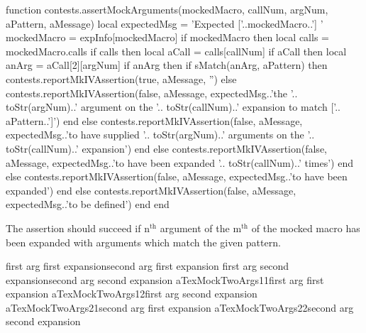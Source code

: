 \startLuaCode
function contests.assertMockArguments(mockedMacro,
                                      callNum,
                                      argNum,
                                      aPattern,
                                      aMessage)
  local expectedMsg = 'Expected ['..mockedMacro..'] '
  mockedMacro = expInfo[mockedMacro]
  if mockedMacro then
    local calls = mockedMacro.calls
    if calls then
      local aCall = calls[callNum]
      if aCall then
        local anArg = aCall[2][argNum]
        if anArg then
          if sMatch(anArg, aPattern) then
            contests.reportMkIVAssertion(true, aMessage, '')
          else
            contests.reportMkIVAssertion(false, aMessage,
              expectedMsg..'the '..
              toStr(argNum)..' argument on the '..
              toStr(callNum)..' expansion to match ['..
              aPattern..']')
          end
        else
          contests.reportMkIVAssertion(false, aMessage,
            expectedMsg..'to have supplied '..
            toStr(argNum)..' arguments on the '..
            toStr(callNum)..' expansion')
        end
      else
        contests.reportMkIVAssertion(false, aMessage,
          expectedMsg..'to have been expanded '..
          toStr(callNum)..' times')
      end
    else
      contests.reportMkIVAssertion(false, aMessage,
        expectedMsg..'to have been expanded')
    end
  else
    contests.reportMkIVAssertion(false, aMessage,
      expectedMsg..'to be defined')
  end
end
\stopLuaCode


The \type{\assertMockNthArgumentOnMthExpansionMatches} assertion should 
succeed if $\text{n}^{\text{th}}$ argument of the $\text{m}^{\text{th}}$ 
of the mocked macro has been expanded with arguments which match the given 
pattern. 

\startConTest
\begingroup
  \aTexMockTwoArgs%
    {first arg first expansion}{second arg first expansion}
  \aTexMockTwoArgs%
    {first arg second expansion}{second arg second expansion}
  \assertMockNthArgumentOnMthExpansionMatches%
    {aTexMockTwoArgs}{1}{1}{first arg first expansion}{}
  \assertMockNthArgumentOnMthExpansionMatches%
    {aTexMockTwoArgs}{1}{2}{first arg second expansion}{}
  \assertMockNthArgumentOnMthExpansionMatches%
    {aTexMockTwoArgs}{2}{1}{second arg first expansion}{}
  \assertMockNthArgumentOnMthExpansionMatches%
    {aTexMockTwoArgs}{2}{2}{second arg second expansion}{}
\endgroup
\stopConTest

